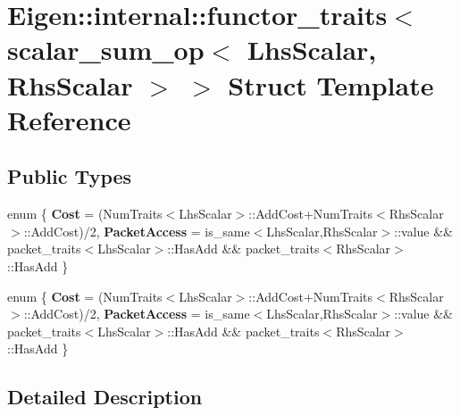 \hypertarget{struct_eigen_1_1internal_1_1functor__traits_3_01scalar__sum__op_3_01_lhs_scalar_00_01_rhs_scalar_01_4_01_4}{}\section{Eigen\+:\+:internal\+:\+:functor\+\_\+traits$<$ scalar\+\_\+sum\+\_\+op$<$ Lhs\+Scalar, Rhs\+Scalar $>$ $>$ Struct Template Reference}
\label{struct_eigen_1_1internal_1_1functor__traits_3_01scalar__sum__op_3_01_lhs_scalar_00_01_rhs_scalar_01_4_01_4}
\subsection*{Public Types}
\begin{DoxyCompactItemize}
\item 
\mbox{\label{struct_eigen_1_1internal_1_1functor__traits_3_01scalar__sum__op_3_01_lhs_scalar_00_01_rhs_scalar_01_4_01_4_ac5f6138f9205ed1567677060d4831862}} 
enum \{ {\bfseries Cost} = (Num\+Traits$<$Lhs\+Scalar$>$\+:\+:Add\+Cost+\+Num\+Traits$<$Rhs\+Scalar$>$\+:\+:Add\+Cost)/2, 
{\bfseries Packet\+Access} = is\+\_\+same$<$Lhs\+Scalar,Rhs\+Scalar$>$\+:\+:value \&\& packet\+\_\+traits$<$Lhs\+Scalar$>$\+:\+:Has\+Add \&\& packet\+\_\+traits$<$Rhs\+Scalar$>$\+:\+:Has\+Add
 \}
\item 
\mbox{\label{struct_eigen_1_1internal_1_1functor__traits_3_01scalar__sum__op_3_01_lhs_scalar_00_01_rhs_scalar_01_4_01_4_a1c9d225ddbcd493bf518f6b30c0d4a0f}} 
enum \{ {\bfseries Cost} = (Num\+Traits$<$Lhs\+Scalar$>$\+:\+:Add\+Cost+\+Num\+Traits$<$Rhs\+Scalar$>$\+:\+:Add\+Cost)/2, 
{\bfseries Packet\+Access} = is\+\_\+same$<$Lhs\+Scalar,Rhs\+Scalar$>$\+:\+:value \&\& packet\+\_\+traits$<$Lhs\+Scalar$>$\+:\+:Has\+Add \&\& packet\+\_\+traits$<$Rhs\+Scalar$>$\+:\+:Has\+Add
 \}
\end{DoxyCompactItemize}


\subsection{Detailed Description}
